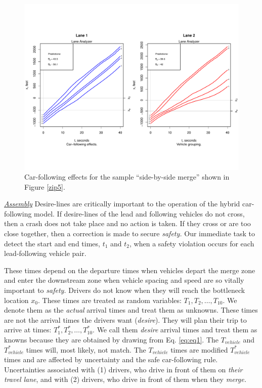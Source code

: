 \documentclass[Proceedings]{ascelike}
\begin{document}
\begin{figure}
\centering
\includegraphics[width = 5.5in]{Rplot11.pdf}
\caption{Car-following effects for the sample  ``side-by-side merge'' shown in Figure \ref{zip5}.}
\label{cfeffects5}
\end{figure}

\vspace{0.1in}
\noindent\emph{\underline{Assembly}}
Desire-lines  are critically important to the operation of the hybrid car-following model. If desire-lines of the lead and following vehicles do not cross, then a crash does not take place and no action is taken. If they cross or are too close together, then a correction is made to secure \emph{safety.} Our immediate task to detect the start and end times, $t_1$ and $t_2$, when a safety violation occurs for each lead-following vehicle pair.


These times depend on the departure times when vehicles depart the merge zone and enter the downstream zone when vehicle spacing and speed are so vitally important to \emph{safety.} Drivers do not know when they will reach the bottleneck location $x_0$.  These times are treated as random variables: $T_1, T_2,\ldots,T_{10}$.  We denote them as the \emph{actual} arrival times and treat them as unknowns. These times are not the arrival  times the drivers want (\emph{desire}).  They will plan their trip to arrive at times: $T^*_1, T^*_2,\ldots,T^*_{10}$. We call them \emph{desire} arrival times and treat them as knowns because they are obtained by drawing from Eq. \ref{eq:eq1}. The  $T_{vehicle}$ and $T_{vehicle}^*$ times will, most likely, not match.  The  $T_{vehicle}$  times are modified   $T_{vehicle}^*$ times and are affected by uncertainty and the safe car-following rule. Uncertainties associated with (1) drivers,  who drive in front of them on \emph{their travel lane}, and with (2) drivers, who drive in front of them when they \emph{merge.}
\end{document}
